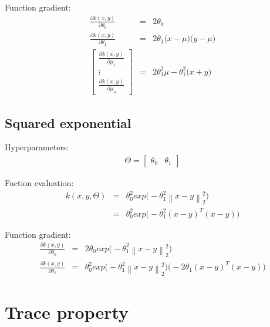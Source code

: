 \documentclass{article}
\begin{document}
Function gradient:
\begin{eqnarray}
\frac{\partial k (x,y)}{\partial \theta_0} &=& 2 \theta_0 \\
\frac{\partial k (x,y)}{\partial \theta_1} &=& 2 \theta_1 \big ( x - \mu \big ) \big ( y - \mu \big ) \\
\begin{bmatrix} 
\frac{\partial k (x,y)}{\partial \mu_1} 
\\ 
\vdots
\\ 
\frac{\partial k (x,y)}{\partial \mu_o} 
\end{bmatrix}
&=& 2 \theta_1^2 \mu - \theta_1^2 \big ( x + y \big )
\end{eqnarray}

\subsection{Squared exponential}

Hyperparameters:
\begin{eqnarray}
\Theta = \begin{bmatrix} \theta_0 & \theta_1 \end{bmatrix}
\end{eqnarray}

Fuction evaluation:
\begin{eqnarray}
k(x,y,\Theta) 
&=& 
\theta_0^2 exp \big ( -\theta_1^2 \left \| x - y \right \| ^2_2 \big ) \\
&=&
\theta_0^2 exp \big ( -\theta_1^2 (x-y)^T (x-y) \big )
\end{eqnarray}

Function gradient:
\begin{eqnarray}
\frac{\partial k (x,y)}{\partial \theta_0} &=& 2 \theta_0 exp \big ( 
-\theta_1^2 \left \| x - y \right \| ^2_2 
\big ) \\
\frac{\partial k (x,y)}{\partial \theta_1} &=& \theta_0^2 exp \big ( 
-\theta_1^2 \left \| x - y \right \| ^2_2 
\big )
\big ( -2 \theta_1(x-y)^T(x-y) \big )
\end{eqnarray}



\appendix
\section{Trace property}
\label{sec:trace_property}
\end{document}
